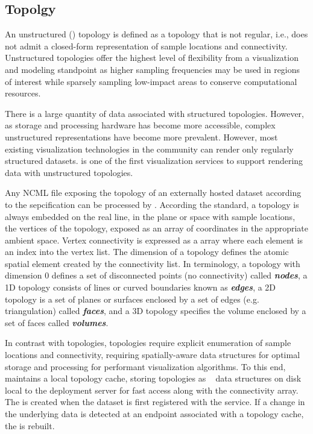 \subsection{\ugrid{} Topolgy}
An unstructured (\ugrid{}) topology is defined as a topology that is
not regular, i.e., does not admit a closed-form representation of
sample locations and connectivity. Unstructured topologies offer the
highest level of flexibility from a visualization and modeling
standpoint as higher sampling frequencies may be used in regions of
interest while sparsely sampling low-impact areas to conserve
computational resources. 

There is a large quantity of \cf{} data associated with structured
topologies. However, as storage and processing hardware has become
more accessible, complex unstructured representations have become more
prevalent. However, most existing visualization technologies in the
\cf{} community can render only regularly structured
datasets. \sciwms{} is one of the first visualization services to
support rendering data with unstructured topologies.

Any NCML file exposing the topology of an externally hosted dataset
according to the \cfugrid{} sepcification can be processed by
\sciwms{}. According the \cfugrid{} standard, a topology is always
embedded on the real line, in the plane or space with sample
locations, the vertices of the topology, exposed as an array of
coordinates in the appropriate ambient space. Vertex connectivity is
expressed as a array where each element is an index into the vertex
list. The dimension of a topology defines the atomic spatial element
created by the connectivity list. In \cfugrid{} terminology, a
topology with dimension 0 defines a set of disconnected points (no
connectivity) called \textbf{\textit{nodes}}, a 1D topology consists
of lines or curved boundaries known as \textbf{\textit{edges}}, a 2D
topology is a set of planes or surfaces enclosed by a set of edges
(e.g. triangulation) called \textbf{\textit{faces}}, and a 3D topology
specifies the volume enclosed by a set of faces called
\textbf{\textit{volumes}}.

In contrast with \cgrid{} topologies, \ugrid{} topologies require
explicit enumeration of sample locations and connectivity, requiring
spatially-aware data structures for optimal storage and processing for
performant visualization algorithms. To this end, \sciwms{} maintains
a local topology cache, storing \ugrid{} topologies as
\rtree{}~\cite{Guttman84} data structures on disk local to the
deployment server for fast access along with the connectivity
array. The \rtree{} is created when the dataset is first registered
with the \sciwms{} service. If a change in the underlying data is
detected at an endpoint associated with a topology cache, the \rtree{}
is rebuilt.
